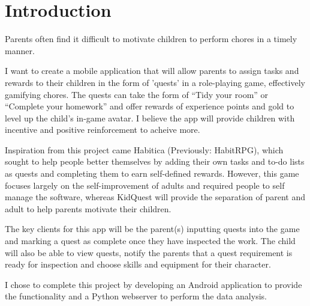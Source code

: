 
\chapter{Introduction}
\label{chap:intro}
Parents often find it difficult to motivate children to perform chores in a timely manner.

I want to create a mobile application that will allow parents to assign tasks and rewards to their children in the form of 'quests' in a role-playing game, effectively gamifying chores. 
The quests can take the form of “Tidy your room” or “Complete your homework” and offer rewards of experience points and gold to level up the child's in-game avatar. 
I believe the app will provide children with incentive and positive reinforcement to acheive more.

Inspiration from this project came Habitica (Previously: HabitRPG), which sought to help people better themselves by adding their own tasks and to-do lists as quests and completing them to earn self-defined rewards. 
However, this game focuses largely on the self-improvement of adults and required people to self manage the software, whereas KidQuest will provide the separation of parent and adult to help parents motivate their children.

The key clients for this app will be the parent(s) inputting quests into the game and marking a quest as complete once they have inspected the work. 
The child will also be able to view quests, notify the parents that a quest requirement is ready for inspection and choose skills and equipment for their character. 

I chose to complete this project by developing an Android application to provide the functionality and a Python webserver to perform the data analysis.
